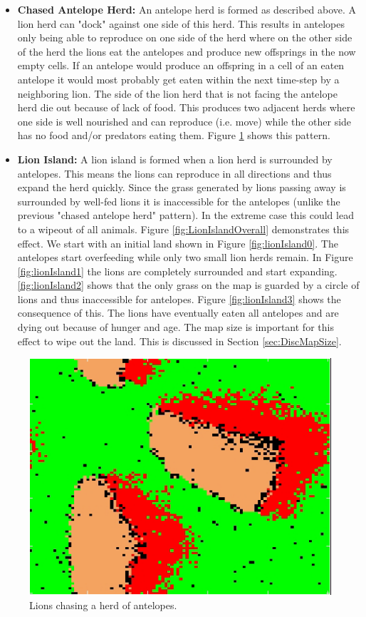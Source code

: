 \documentclass[11pt]{article}
\begin{document}
\begin{itemize}
\item {\bf Chased Antelope Herd:} An antelope herd is formed as described above. A lion herd can "dock" against one side of this herd. This results in antelopes only being able to reproduce on one side of the herd where on the other side of the herd the lions eat the antelopes and produce new offsprings in the now empty cells. If an antelope would produce an offspring in a cell of an eaten antelope it would most probably get eaten within the next time-step by a neighboring lion. The side of the lion herd that is not facing the antelope herd die out because of lack of food. This produces two adjacent herds where one side is well nourished and can reproduce (i.e. move) while the other side has no food and/or predators eating them. Figure \ref{fig:chasedAntelopesHerd} shows this pattern.
\item {\bf Lion Island:} A lion island is formed when a lion herd is surrounded by antelopes. This means the lions can reproduce in all directions and thus expand the herd quickly. Since the grass generated by lions passing away is surrounded by well-fed lions it is inaccessible for the antelopes (unlike the previous "chased antelope herd" pattern). In the extreme case this could lead to a wipeout of all animals. Figure \ref{fig:LionIslandOverall} demonstrates this effect. We start with an initial land shown in Figure \ref{fig:lionIsland0}. The antelopes start overfeeding while only two small lion herds remain. In Figure \ref{fig:lionIsland1} the lions are completely surrounded and start expanding. \ref{fig:lionIsland2} shows that the only grass on the map is guarded by a circle of lions and thus inaccessible for antelopes. Figure \ref{fig:lionIsland3} shows the consequence of this. The lions have eventually eaten all antelopes and are dying out because of hunger and age. The map size is important for this effect to wipe out the land. This is discussed in Section \ref{sec:DiscMapSize}.
\end{itemize}

\begin{figure}
\centering
\includegraphics[scale=1]{chasedHerd}
\caption{Lions chasing a herd of antelopes.}
\label{fig:chasedAntelopesHerd}
\end{figure}
\end{document}
